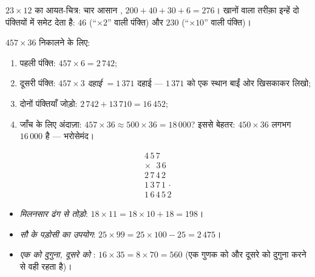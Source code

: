 \begin{omfigure}

{\small $23 \times 12$ का आयत-चित्र: चार आसान ,
$200 + 40 + 30 + 6 = 276$। खानों वाला तरीक़ा इन्हें दो
पंक्तियों में समेट देता है: $46$ (``$\times 2$'' वाली पंक्ति)
और $230$ (``$\times 10$'' वाली पंक्ति)।}
\end{omfigure}

\begin{method}[दो अंकों की संख्या से खानों में गुणा]\label{met:g4:mult:column}
$457 \times 36$ निकालने के लिए:
\begin{enumerate}
  \item पहली पंक्ति: $457 \times 6 = 2\,742$;
  \item दूसरी पंक्ति: $457 \times 3$ \emph{दहाई} $= 1\,371$
        दहाई --- $1\,371$ को एक स्थान बाईं ओर खिसकाकर लिखो;
  \item दोनों पंक्तियाँ जोड़ो: $2\,742 + 13\,710 = 16\,452$;
  \item जाँच के लिए अंदाज़ा: $457 \times 36 \approx 500 \times 36
        = 18\,000$? इससे बेहतर: $450 \times 36$ लगभग $16\,000$
        है --- भरोसेमंद।
\end{enumerate}
\[
\begin{array}{r}
4\,5\,7 \\
\times\ \ \,3\,6 \\
\hline
2\,7\,4\,2 \\
1\,3\,7\,1\,\cdot \\
\hline
1\,6\,4\,5\,2
\end{array}
\]
\end{method}

\begin{example}[मानसिक तरकीबें]\label{ex:g4:mult:tricks}
\begin{itemize}
  \item \emph{मिलनसार ढंग से तोड़ो}: $18 \times 11 = 18 \times 10
        + 18 = 198$।
  \item \emph{सौ के पड़ोसी का उपयोग}: $25 \times 99 = 25 \times 100 -
        25 = 2\,475$।
  \item \emph{एक को दुगुना, दूसरे को }: $16 \times 35 = 8 \times 70 =
        560$ (एक गुणक को  और दूसरे को दुगुना करने से
         वही रहता है)।
\end{itemize}
\end{example}

